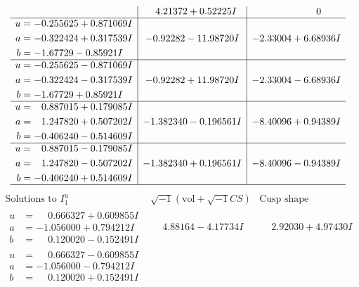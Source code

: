 \documentclass[1p]{elsarticle_modified}
\theoremstyle{definition}
\newcommand{\I}{\sqrt{-1}}
\begin{document}
$$\begin{array}{c|c|c}
 & \phantom{-}4.21372 + 0.52225 I & \phantom{-0.000000 } 0 \\ \hline\begin{aligned}
u &= -0.255625 + 0.871069 I \\
a &= -0.322424 + 0.317539 I \\
b &= -1.67729 - 0.85921 I\end{aligned}
 & -0.92282 - 11.98720 I & -2.33004 + 6.68936 I \\ \hline\begin{aligned}
u &= -0.255625 - 0.871069 I \\
a &= -0.322424 - 0.317539 I \\
b &= -1.67729 + 0.85921 I\end{aligned}
 & -0.92282 + 11.98720 I & -2.33004 - 6.68936 I \\ \hline\begin{aligned}
u &= \phantom{-}0.887015 + 0.179085 I \\
a &= \phantom{-}1.247820 + 0.507202 I \\
b &= -0.406240 - 0.514609 I\end{aligned}
 & -1.382340 - 0.196561 I & -8.40096 + 0.94389 I \\ \hline\begin{aligned}
u &= \phantom{-}0.887015 - 0.179085 I \\
a &= \phantom{-}1.247820 - 0.507202 I \\
b &= -0.406240 + 0.514609 I\end{aligned}
 & -1.382340 + 0.196561 I & -8.40096 - 0.94389 I\\
 \hline 
 \end{array}$$\newpage$$\begin{array}{c|c|c}  
\text{Solutions to }I^u_{1}& \I (\text{vol} + \sqrt{-1}CS) & \text{Cusp shape}\\
 \hline 
\begin{aligned}
u &= \phantom{-}0.666327 + 0.609855 I \\
a &= -1.056000 + 0.794212 I \\
b &= \phantom{-}0.120020 - 0.152491 I\end{aligned}
 & \phantom{-}4.88164 - 4.17734 I & \phantom{-}2.92030 + 4.97430 I \\ \hline\begin{aligned}
u &= \phantom{-}0.666327 - 0.609855 I \\
a &= -1.056000 - 0.794212 I \\
b &= \phantom{-}0.120020 + 0.152491 I\end{aligned}

\end{array}$$
\end{document}
